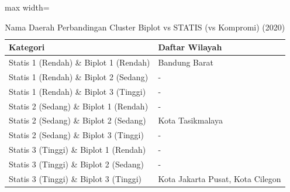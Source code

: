 \begin{table}[H]
\centering
\caption{Nama Daerah Perbandingan Cluster Biplot vs STATIS (vs Kompromi) (2020)} \makeatletter{}\makeatother
\begin{adjustbox}{max width=\textwidth}
\begin{tabular}{|p{4cm}|p{10cm}|}
\hline
\textbf{Kategori} & \textbf{Daftar Wilayah} \\
\hline
Statis 1 (Rendah) \& Biplot 1 (Rendah) & Bandung Barat \\
\hline
Statis 1 (Rendah) \& Biplot 2 (Sedang) & - \\
\hline
Statis 1 (Rendah) \& Biplot 3 (Tinggi) & - \\
\hline
Statis 2 (Sedang) \& Biplot 1 (Rendah) & - \\
\hline
Statis 2 (Sedang) \& Biplot 2 (Sedang) & Kota Tasikmalaya \\
\hline
Statis 2 (Sedang) \& Biplot 3 (Tinggi) & - \\
\hline
Statis 3 (Tinggi) \& Biplot 1 (Rendah) & - \\
\hline
Statis 3 (Tinggi) \& Biplot 2 (Sedang) & - \\
\hline
Statis 3 (Tinggi) \& Biplot 3 (Tinggi) & Kota Jakarta Pusat, Kota Cilegon \\
\hline
\end{tabular}
\end{adjustbox}
\end{table}